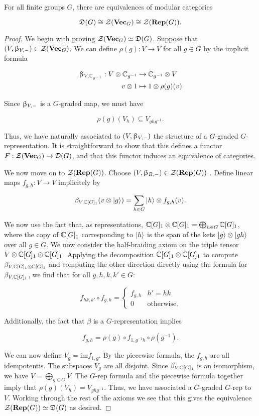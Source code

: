 \begin{prop} For all finite groups $G$, there are equivalences of modular categories

$${\mathfrak D}(G)\cong {\mathcal Z}({\bf Vec}_G)\cong {\mathcal Z}({\bf Rep}(G)).$$
\end{prop}
\begin{proof} We begin with proving ${\mathcal Z}({\bf Vec}_G)\simeq {\mathfrak D}(G)$. Suppose that $(V,\upbeta_{V,-})\in {\mathcal Z}({\bf Vec}_G)$. We can define $\rho(g):V\to V$ for all $g\in G$ by the implicit formula

\begin{align*}
\upbeta_{V,{\mathbb C}_{g^{-1}}}:V\otimes {\mathbb C}_{g^{-1}}&\to {\mathbb C}_{g^{-1}}\otimes V\\
v\otimes 1 &\mapsto 1\otimes \rho(g)(v)
\end{align*}

Since $\upbeta_{V,-}$ is a $G$-graded map, we must have

$$\rho(g)(V_h)\subseteq V_{ghg^{-1}}.$$

Thus, we have naturally associated to $(V,\upbeta_{V,-})$ the structure of a $G$-graded $G$-representation. It is straightforward to show that this defines a functor $F:{\mathcal Z}({\bf Vec}_G)\to {\mathcal D}(G)$, and that this functor induces an equivalence of categories.

We now move on to ${\mathcal Z}({\bf Rep}(G))$. Choose $(V,\upbeta_{B,-})\in {\mathcal Z}({\bf Rep}(G))$ . Define linear maps $f_{g,h}:V\to V$ implicitely by

$$\beta_{V,{\mathbb C}[G]_1}(v\otimes \ket{g})=\sum_{h\in G}\ket{h}\otimes f_{g,h}(v).$$

We now use the fact that, as representations, ${\mathbb C}[G]_1\otimes {\mathbb C}[G]_1=\bigoplus_{h\in G}{\mathbb C}[G]_1$, where the copy of ${\mathbb C}[G]_1$ corresponding to $\ket{h}$ is the span of the kets $\ket{g}\otimes \ket{gh}$ over all $g\in G$. We now consider the half-braiding axiom on the triple tensor $V\otimes {\mathbb C}[G]_1\otimes {\mathbb C}[G]_1$. Applying the decomposition ${\mathbb C}[G]_1\otimes {\mathbb C}[G]_1$ to compute $\beta_{V,{\mathbb C}[G]_1\otimes {\mathbb C}[G]_1}$ and computing the other direction directly using the formula for $\beta_{V,{\mathbb C}[G]_1}$, we find that for all $g,h,k,k'\in G$:

$$f_{hk,k'}\circ f_{g,h}=
\begin{cases}
f_{g,h} & h'=hk\\
0 & \text{otherwise}.
\end{cases}$$

Additionally, the fact that $\beta$ is a $G$-representation implies

$$f_{g,h}=\rho(g)\circ f_{1,g^{-1}h}\circ \rho(g^{-1}).$$

We can now define $V_g=\text{im} f_{1,g}$. By the piecewise formula, the $f_{g,h}$ are all idempotentis. The subspaces $V_g$ are all disjoint. Since $\beta_{V,{\mathbb C}[G]_1}$ is an isomorphism, we have $V=\bigoplus_{g\in G}V$. The $G$-rep formula and the piecewise formula together imply that $\rho(g)(V_h)=V_{ghg^{-1}}$. Thus, we have associated a $G$-graded $G$-rep to $V$. Working through the rest of the axioms we see that this gives the equivalence ${\mathcal Z}({\bf Rep}(G))\simeq {\mathfrak D}(G)$ as desired.
\end{proof}

